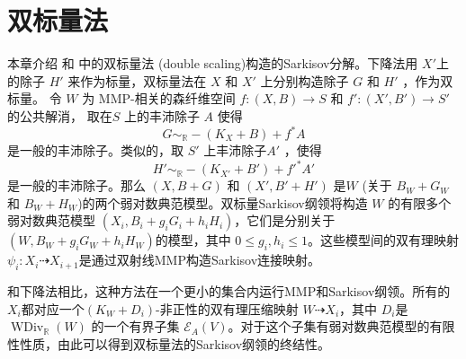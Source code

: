 \chapter{双标量法}
 本章介绍\cite[\S 13]{haconMinimalModelProgram2012} 和  \cite{liuSarkisovProgramGeneralized2021}中的双标量法 (double scaling)构造的Sarkisov分解。下降法用 $X'$上的除子 $H'$ 来作为标量，双标量法在  $X$ 和 $X'$ 上分别构造除子 $G$ 和 $H'$ ，作为双标量。
令 $W$ 为 MMP-相关的森纤维空间 $f:(X,B)\to S$ 和 $f':(X',B')\to S'$  的公共解消，  取在$ S $ 上的丰沛除子 $A$ 使得
\[G \sim_{\mathbb{R}} -(K_{X}+B) +f^*A\]
是一般的丰沛除子。类似的，取 $S'$ 上丰沛除子$A'$ ，使得 
\[H' \sim_{\mathbb{R}} -(K_{X'}+B') +f'^*A'\]
是一般的丰沛除子。那么  $(X,B+G)$ 和 $(X',B'+H')$  是$W$ (关于 $B_{W}+G_{W}$ 和 $B_{W}+H_{W}$)的两个弱对数典范模型。双标量Sarkisov纲领将构造 $W$ 的有限多个弱对数典范模型 $(X_{i},B_{i}+g_{i}G_{i}+h_{i}H_{i})$，它们是分别关于 $(W,B_{W}+g_{i}G_{W}+h_{i}H_{W})$的模型，其中 $0\leqslant g_i,h_i\leqslant 1$。这些模型间的双有理映射 $\psi_{i}:X_{i}\dashrightarrow X_{i+1}$是通过双射线MMP构造Sarkisov连接映射。

和下降法相比，这种方法在一个更小的集合内运行MMP和Sarkisov纲领。所有的 $X_{i}$都对应一个$(K_{W}+D_{i})$-非正性的双有理压缩映射 $W\dashrightarrow X_{i}$，其中 $D_{i}$是 $\operatorname{WDiv}_{\mathbb{R}}(W)$ 的一个有界子集 $\mathcal{E}_{A}(V)$。对于这个子集有弱对数典范模型的有限性性质，由此可以得到双标量法的Sarkisov纲领的终结性。
